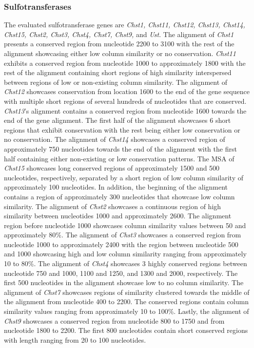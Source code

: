 \documentclass{article}
\begin{document}
\subsubsection{Sulfotransferases}
The evaluated sulfotransferase genes are \textit{Chst1, Chst11, Chst12, Chst13, Chst14, Chst15, Chst2, Chst3, Chst4, Chst7, Chst9,} and \textit{Ust}. The alignment of \textit{Chst1} presents a conserved region from nucleotide 2200 to 3100 with the rest of the alignment showcasing either low column similarity or no conservation. \textit{Chst11} exhibits a conserved region from nucleotide 1000 to approximately 1800 with the rest of the alignment containing short regions of high similarity interspersed between regions of low or non-existing column similarity. The alignment of \textit{Chst12} showcases conservation from location 1600 to the end of the gene sequence with multiple short regions of several hundreds of nucleotides that are conserved. \textit{Chst13}'s alignment contains a conserved region from nucleotide 1600 towards the end of the gene alignment. The first half of the alignment showcases 6 short regions that exhibit conservation with the rest being either low conservation or no conservation. The alignment of \textit{Chst14} showcases a conserved region of approximately 750 nucleotides towards the end of the alignment with the first half containing either non-existing or low conservation patterns. The MSA of \textit{Chst15} showcases long conserved regions of approximately 1500 and 500 nucleotides, respectively, separated by a short region of low column similarity of approximately 100 nucleotides. In addition, the beginning of the alignment contains a region of approximately 300 nucleotides that showcase low column similarity. The alignment of \textit{Chst2} showcases a continuous region of high similarity between nucleotides 1000 and approximately 2600. The alignment region before nucleotide 1000 showcases column similarity values between 50 and approximately 80\%. The alignment of \textit{Chst3} showcases a conserved region from nucleotide 1000 to approximately 2400 with the region between nucleotide 500 and 1000 showcasing high and low column similarity ranging from approximately 10 to 80\%. The alignment of \textit{Chst4} showcases 3 highly conserved regions between nucleotide 750 and 1000, 1100 and 1250, and 1300 and 2000, respectively. The first 500 nucleotides in the alignment showcase low to no column similarity. The alignment of \textit{Chst7} showcases regions of similarity clustered towards the middle of the alignment from nucleotide 400 to 2200. The conserved regions contain column similarity values ranging from approximately 10 to 100\%. Lastly, the alignment of \textit{Chst9} showcases a conserved region from nucleotide 800 to 1750 and from nucleotide 1800 to 2200. The first 800 nucleotides contain short conserved regions with length ranging from 20 to 100 nucleotides. 
\end{document}
